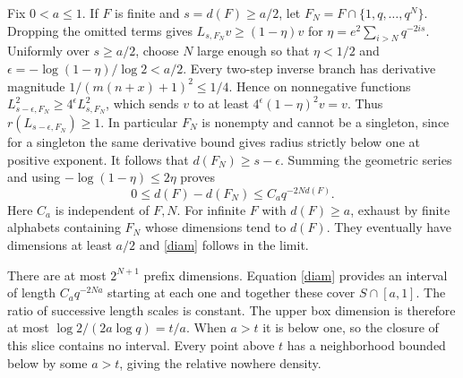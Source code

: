 \documentclass[11pt,a4paper]{amsart}
\begin{document}
Fix $0<a\le1$. If $F$ is finite and $s=d(F)\ge a/2$, let $F_N=F\cap\{1,q,\ldots,q^N\}$. Dropping the omitted terms gives $L_{s,F_N}v\ge(1-\eta)v$ for $\eta=e^2\sum_{i>N}q^{-2is}$. Uniformly over $s\ge a/2$, choose $N$ large enough so that $\eta<1/2$ and $\epsilon=-\log(1-\eta)/\log2<a/2$. Every two-step inverse branch has derivative magnitude $1/(m(n+x)+1)^2\le 1/4$. Hence on nonnegative functions $L_{s-\epsilon,F_N}^2\ge4^\epsilon L_{s,F_N}^2$, which sends $v$ to at least $4^\epsilon(1-\eta)^2 v=v$. Thus $r(L_{s-\epsilon,F_N})\ge1$. In particular $F_N$ is nonempty and cannot be a singleton, since for a singleton the same derivative bound gives radius strictly below one at positive exponent. It follows that $d(F_N)\ge s-\epsilon$. Summing the geometric series and using $-\log(1-\eta)\le2\eta$ proves
\begin{equation}
0\le d(F)-d(F_N)\le C_a q^{-2N d(F)}.
\label{diam}
\end{equation}
Here $C_a$ is independent of $F,N$. For infinite $F$ with $d(F)\ge a$, exhaust by finite alphabets containing $F_N$ whose dimensions tend to $d(F)$. They eventually have dimensions at least $a/2$ and \eqref{diam} follows in the limit.

There are at most $2^{N+1}$ prefix dimensions. Equation \eqref{diam} provides an interval of length $C_a q^{-2Na}$ starting at each one and together these cover $S\cap[a,1]$. The ratio of successive length scales is constant. The upper box dimension is therefore at most $\log 2/(2a\log q)=t/a$. When $a>t$ it is below one, so the closure of this slice contains no interval. Every point above $t$ has a neighborhood bounded below by some $a>t$, giving the relative nowhere density.
\end{document}
